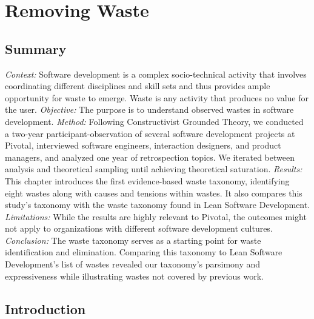 \chapter{Removing Waste}
\label{SoftwareEngineeringWasteChapter}
\section{Summary}

\textit{Context:} Software development is a complex socio-technical activity that involves coordinating different disciplines and skill sets and thus provides ample opportunity for waste to emerge. Waste is any activity that produces no value for the user.
\textit{Objective:} The purpose is to understand observed wastes in software development.
\textit{Method:} Following Constructivist Grounded Theory, we conducted a two-year participant-observation of several software development projects at Pivotal, interviewed \numberOfInterviews{} software engineers, interaction designers, and product managers, and analyzed one year of retrospection topics. We iterated between analysis and theoretical sampling until achieving theoretical saturation.
\textit{Results:}  This chapter introduces the first evidence-based waste taxonomy, identifying eight wastes along with causes and tensions within wastes. It also compares this study's taxonomy with the waste taxonomy found in Lean Software Development.
\textit{Limitations:} While the results are highly relevant to Pivotal, the outcomes might not apply to organizations with different software development cultures.
\textit{Conclusion:} The waste taxonomy serves as a starting point for waste identification and elimination. Comparing this taxonomy to Lean Software Development's list of wastes revealed our taxonomy's parsimony and expressiveness while illustrating wastes not covered by previous work. 

\section{Introduction}

